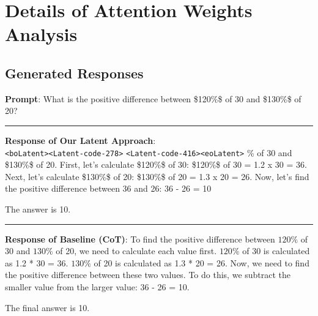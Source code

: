 \section{Details of Attention Weights Analysis}
\label{app:attention}
\subsection{Generated Responses}
\label{app:generated_text_attention}
\begin{tcolorbox}[title=Question 1, colback=white]
\textbf{Prompt}: What is the positive difference between 
  \$120\%\$ of 30 and \$130\%\$ of 20?\\
\noindent\rule{\textwidth}{0.5pt}
\textbf{Response of Our Latent Approach}: \\
\verb|<boLatent>|\verb|<Latent-code-278>|
\verb|<Latent-code-416>|\verb|<eoLatent>|  \% of 30 and \$130\%\$ of 20. First, let's calculate \$120\%\$ of 30: \$120\%\$ of 30 = 1.2 x 30 = 36. Next, let's calculate \$130\%\$ of 20: \$130\%\$ of 20 = 1.3 x 20 = 26. Now, let's find the positive difference between 36 and 26: 36 - 26 = 10 

The answer is 10.

\noindent\rule{\textwidth}{0.5pt} %
\textbf{Response of Baseline (CoT)}: To find the positive difference between $120\%$ of 30 and $130\%$ of 20, we need to calculate each value first.
$120\%$ of 30 is calculated as 1.2 * 30 = 36.
$130\%$ of 20 is calculated as 1.3 * 20 = 26.
Now, we need to find the positive difference between these two values. To do this, we subtract the smaller value from the larger value:
36 - 26 = 10.

The final answer is 10.
\end{tcolorbox}

